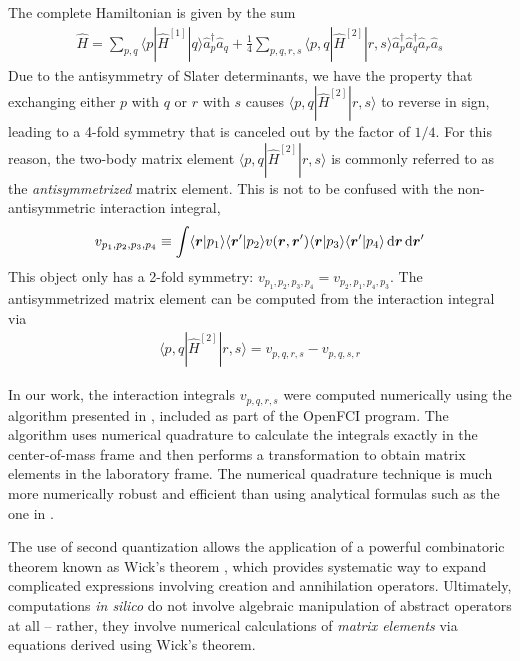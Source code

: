 The complete Hamiltonian is given by the sum
\begin{align}
  \hat{H} = \sum_{p, q} \langle p | \hat{H}^{[1]} | q \rangle \hat{a}_p^\dagger \hat{a}_q + \frac{1}{4} \sum_{p, q, r, s} \langle p, q | \hat{H}^{[2]} | r, s \rangle \hat{a}_p^\dagger \hat{a}_q^\dagger \hat{a}_r \hat{a}_s  \label{eq:vacuumhamiltonian}
\end{align}
Due to the antisymmetry of Slater determinants, we have the property that exchanging either $p$ with $q$ or $r$ with $s$ causes $\langle p, q | \hat{H}^{[2]} | r, s \rangle$ to reverse in sign, leading to a 4-fold symmetry that is canceled out by the factor of $1/4$.  For this reason, the two-body matrix element $\langle p, q | \hat{H}^{[2]} | r, s \rangle$ is commonly referred to as the \emph{antisymmetrized} matrix element.  This is not to be confused with the non-antisymmetric interaction integral,
\begin{align*}
  v_{p_1, p_2, p_3, p_4} \equiv \int \langle \bm{r} | p_1 \rangle \langle \bm{r}' | p_2 \rangle v(\bm r, \bm r') \langle \bm{r} | p_3 \rangle \langle \bm{r}' | p_4 \rangle \operatorname{d\!} \bm{r} \operatorname{d\!} \bm{r}'
\end{align*}
This object only has a 2-fold symmetry: $v_{p_1, p_2, p_3, p_4} = v_{p_2, p_1, p_4, p_3}$.  The antisymmetrized matrix element can be computed from the interaction integral via
\begin{align*}
  \langle p, q | \hat{H}^{[2]} | r, s \rangle = v_{p, q, r, s} - v_{p, q, s, r}
\end{align*}

In our work, the interaction integrals $v_{p, q, r, s}$ were computed numerically using the algorithm presented in \cite{2008arXiv0810.2644K}, included as part of the OpenFCI program.  The algorithm uses numerical quadrature to calculate the integrals exactly in the center-of-mass frame and then performs a transformation to obtain matrix elements in the laboratory frame.  The numerical quadrature technique is much more numerically robust and efficient than using analytical formulas such as the one in \cite{0953-8984-10-3-013}.

The use of second quantization allows the application of a powerful combinatoric theorem known as Wick's theorem \cite{shavitt2009many}, which provides systematic way to expand complicated expressions involving creation and annihilation operators.  Ultimately, computations \textit{in silico} do not involve algebraic manipulation of abstract operators at all -- rather, they involve numerical calculations of \emph{matrix elements} via equations derived using Wick's theorem.


